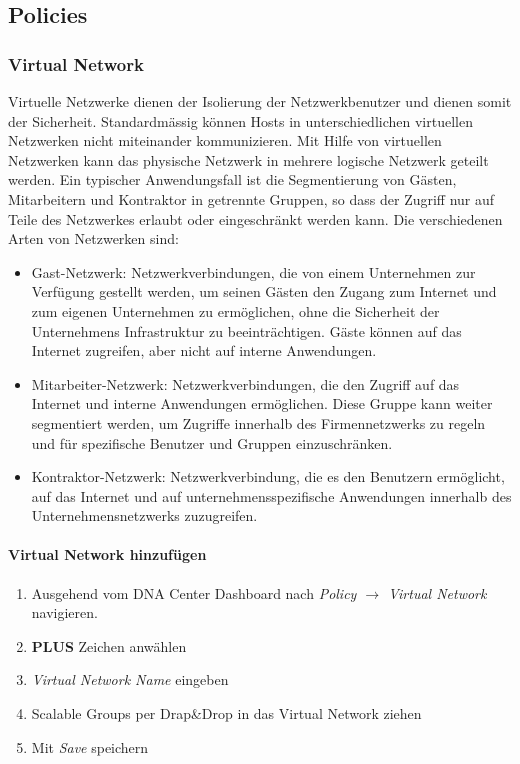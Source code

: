 \subsection{Policies}

\subsubsection{Virtual Network}
Virtuelle Netzwerke dienen der Isolierung der Netzwerkbenutzer und dienen somit der Sicherheit. Standardmässig können Hosts in unterschiedlichen virtuellen Netzwerken nicht miteinander kommunizieren. Mit Hilfe von virtuellen Netzwerken kann das physische Netzwerk in mehrere logische Netzwerk geteilt werden. Ein typischer Anwendungsfall ist die Segmentierung von Gästen, Mitarbeitern und Kontraktor in getrennte Gruppen, so dass der Zugriff nur auf Teile des Netzwerkes erlaubt oder eingeschränkt werden kann. Die verschiedenen Arten von Netzwerken sind:

\begin{itemize}
	\item Gast-Netzwerk: Netzwerkverbindungen, die von einem Unternehmen zur Verfügung gestellt werden, um seinen Gästen den Zugang zum Internet und zum eigenen Unternehmen zu ermöglichen, ohne die Sicherheit der Unternehmens Infrastruktur zu beeinträchtigen. Gäste können auf das Internet zugreifen, aber nicht auf interne Anwendungen.
	\item Mitarbeiter-Netzwerk: Netzwerkverbindungen, die den Zugriff auf das Internet und interne Anwendungen ermöglichen. Diese Gruppe kann weiter segmentiert werden, um Zugriffe innerhalb des Firmennetzwerks zu regeln und für spezifische Benutzer und Gruppen einzuschränken.
	\item Kontraktor-Netzwerk: Netzwerkverbindung, die es den Benutzern ermöglicht, auf das Internet und auf unternehmensspezifische Anwendungen innerhalb des Unternehmensnetzwerks zuzugreifen. 
\end{itemize}

\paragraph{Virtual Network hinzufügen}
\begin{enumerate}
	\item Ausgehend vom DNA Center Dashboard nach \textit{Policy $\rightarrow$ Virtual Network} navigieren.
	\item \textbf{PLUS} Zeichen anwählen
	\item \textit{Virtual Network Name} eingeben
	\item Scalable Groups per Drap\&Drop in das Virtual Network ziehen
	\item Mit \textit{Save} speichern
\end{enumerate}

